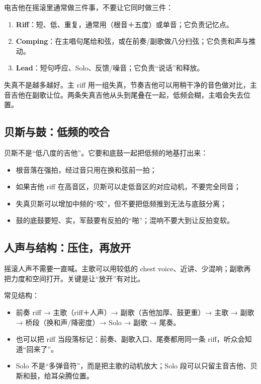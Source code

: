 电吉他在摇滚里通常做三件事，不要让它同时做三件：

\begin{enumerate}
\item \textbf{Riff}：短、低、重复，通常用（根音＋五度）或单音；它负责记忆点。
\item \textbf{Comping}：在主唱句尾给和弦，或在前奏/副歌做八分扫弦；它负责和声与推动。
\item \textbf{Lead}：短句呼应、Solo、反馈/噪音；它负责“说话”和释放。
\end{enumerate}

失真不是越多越好。主 riff 用一组失真，节奏吉他可以用稍干净的音色做对比，主音吉他在副歌让位。两条失真吉他从头到尾叠在一起，低频会糊，主唱会失去位置。

\subsection{贝斯与鼓：低频的咬合}
\label{sec:rock-rhythm-section}

贝斯不是“低八度的吉他”。它要和底鼓一起把低频的地基打出来：

\begin{itemize}
\item 根音落在强拍，经过音只用在换和弦前一拍；
\item 如果吉他 riff 在高音区，贝斯可以走低音区的对应动机，不要完全同音；
\item 失真贝斯可以增加中频的“咬”，但不要把低频推到无法与底鼓分离；
\item 鼓的底鼓要短、实，军鼓要有反拍的“啪”；混响不要大到让反拍变软。
\end{itemize}

\subsection{人声与结构：压住，再放开}
\label{sec:rock-vocal-form}

摇滚人声不需要一直喊。主歌可以用较低的 chest voice、近讲、少混响；副歌再把力度和空间打开。关键是让“放开”有对比。

常见结构：

\begin{itemize}
\item 前奏 riff → 主歌（riff＋人声）→ 副歌（吉他加厚、鼓更重）→ 主歌 → 副歌 → 桥段（换和声/降密度）→ Solo → 副歌 → 尾奏。
\item 也可以把 riff 当段落标记：前奏、副歌入口、尾奏都用同一条 riff，听众会知道“回来了”。
\item Solo 不是“多弹音符”，而是把主歌的动机放大；Solo 段可以只留主音吉他、贝斯和鼓，给耳朵腾位置。
\end{itemize}

